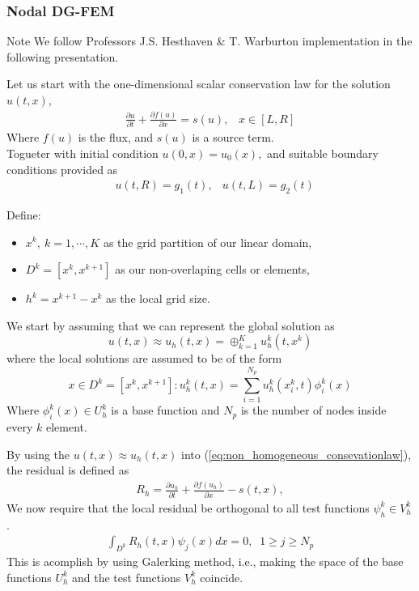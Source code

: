 \begin{frame}
  \frametitle{Nodal DG-FEM}
  \begin{block}{Note}
     We follow Professors J.S. Hesthaven \& T. Warburton implementation \cite{hesthaven2008nodal} in the following presentation.
  \end{block}
  Let us start with the one-dimensional scalar conservation law for the solution $u(t,x)$,
  \begin{align}
    \frac{\partial u}{\partial t} + \frac{\partial f(u)}{\partial x} = s(u), \;\;\; x \in [L,R]
		\label{eq:non_homogeneous_consevationlaw}
  \end{align}	
  Where $f(u)$ is the flux, and $s(u)$ is a source term. \\
	Togueter with initial condition $u(0,x) = u_0(x),$ and suitable boundary conditions provided as
	\begin{align}
	&u(t,R)=g_1(t), &u(t,L)=g_2(t) 
	\end{align}
\end{frame}

\begin{frame}
	Define:
	\begin{itemize}
	\item $x^k, \ k=1,\cdots,K$ as the grid partition of our linear domain,
	\item $D^k = [x^k,x^{k+1}]$ as our non-overlaping cells or elements,
	\item $h^k = x^{k+1}-x^k$ as the local grid size.
	\end{itemize}
	We start by assuming that we can represent the global solution as
	\begin{equation}
   u(t,x) \approx u_h(t,x) = \oplus^K_{k=1} u^k_h(t,x^k)
  \end{equation}
	where the local solutions are assumed to be of the form
	\begin{equation}
	x \in D^k = [x^k,x^{k+1}]: u_h^k(t,x) = \sum_{i=1}^{N_p} u_h^k(x_i^k,t)\phi_i^k(x)
	\end{equation}
	Where $\phi_i^k(x) \in U_h^k$ is a base function and $N_p$ is the number of nodes inside every $k$ element.
\end{frame}

\begin{frame}
	By using the $u(t,x) \approx u_h(t,x)$ into (\ref{eq:non_homogeneous_consevationlaw}), the residual is defined as
	\begin{align}
	 R_h = \frac{\partial u_h}{\partial t} + \frac{\partial f(u_h)}{\partial x} - s(t,x),
	\label{eq:residual}
	\end{align}
	We now require that the local residual be orthogonal to all test functions $\psi_h^k \in V_h^k$.
	\begin{align}
	\int_{D^k} R_h(t,x) \psi_j(x)dx = 0, \;\; 1 \geq j \geq N_p
	\end{align}
	This is acomplish by using Galerking method, i.e., making the space of the base functions $U_h^k$ and the test functions $V_h^k$ coincide.
\end{frame}

